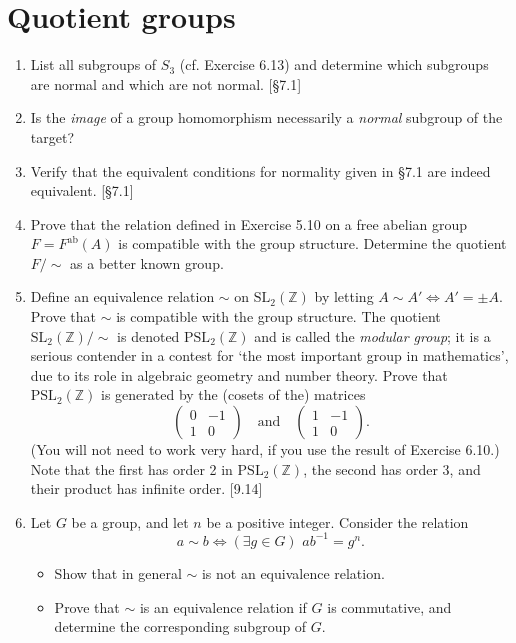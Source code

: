 \section{Quotient groups}
\begin{enumerate}
    \item List all subgroups of $S_3$ (cf. Exercise 6.13) and determine which subgroups are normal and which are not normal. [\S7.1]

    \item Is the \emph{image} of a group homomorphism necessarily a \emph{normal} subgroup of the target?

    \item Verify that the equivalent conditions for normality given in \S7.1 are indeed equivalent. [\S7.1]

    \item Prove that the relation defined in Exercise 5.10 on a free abelian group $F = F^{\text{ab}}(A)$ is compatible with the group structure. Determine the quotient $F/\sim$ as a better known group.

    \item Define an equivalence relation $\sim$ on $\text{SL}_2(\mathbb{Z})$ by letting $A \sim A' \iff A' = \pm A$. Prove that $\sim$ is compatible with the group structure. The quotient $\text{SL}_2(\mathbb{Z})/\sim$ is denoted $\text{PSL}_2(\mathbb{Z})$ and is called the \textit{modular group}; it is a serious contender in a contest for `the most important group in mathematics', due to its role in algebraic geometry and number theory. Prove that $\text{PSL}_2(\mathbb{Z})$ is generated by the (cosets of the) matrices
          \[ \begin{pmatrix} 0 & -1 \\ 1 & 0 \end{pmatrix} \quad \text{and} \quad \begin{pmatrix} 1 & -1 \\ 1 & 0 \end{pmatrix}. \]
          (You will not need to work very hard, if you use the result of Exercise 6.10.) Note that the first has order 2 in $\text{PSL}_2(\mathbb{Z})$, the second has order 3, and their product has infinite order. [9.14]

    \item Let $G$ be a group, and let $n$ be a positive integer. Consider the relation
          \[ a \sim b \iff (\exists g \in G) \,\, ab^{-1} = g^n. \]
          \begin{itemize}
              \item Show that in general $\sim$ is not an equivalence relation.
              \item Prove that $\sim$ is an equivalence relation if $G$ is commutative, and determine the corresponding subgroup of $G$.
          \end{itemize}


\end{enumerate}
